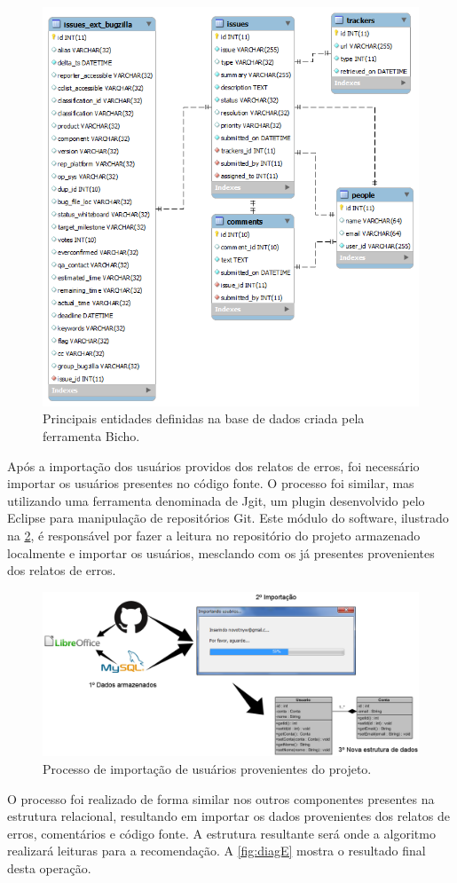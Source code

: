 \documentclass[oneside,brazil,a4paper]{normas-utf-tex}
\begin{document}
\begin{figure}[hbt]
    \centering
    \includegraphics[width=.58\textwidth]{figuras/bicho}
    \caption{Principais entidades definidas na base de dados criada pela ferramenta Bicho.}
    \label{fig:bd-bicho}
 \end{figure}

Após a importação dos usuários providos dos relatos de erros, foi necessário importar os usuários presentes no código fonte. O processo foi similar, mas utilizando uma ferramenta denominada de Jgit, um plugin desenvolvido pelo Eclipse para manipulação de repositórios Git. Este módulo do software, ilustrado na \cref{fig:impu}, é responsável por fazer a leitura no repositório do projeto armazenado localmente e importar os usuários, mesclando com os já presentes provenientes dos relatos de erros.

\begin{figure}[hbt]
    \centering
    \includegraphics[width=.95\textwidth]{figuras/impe}
    \caption{Processo de importação de usuários provenientes do projeto.}
    \label{fig:impu}
\end{figure}

O processo foi realizado de forma similar nos outros componentes presentes na estrutura relacional, resultando em importar os dados provenientes dos relatos de erros, comentários e código fonte. A estrutura resultante será onde a algoritmo realizará leituras para a recomendação. A \cref{fig:diagE} mostra o resultado final desta operação. 
\end{document}
